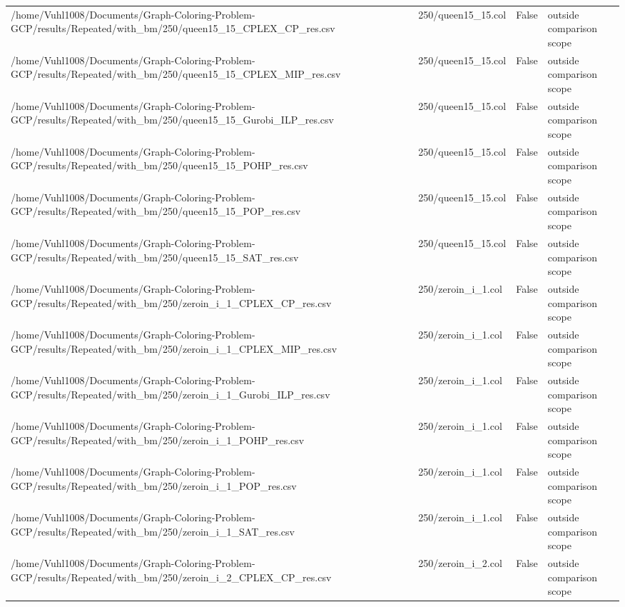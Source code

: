 \begin{table}[htbp]
\begin{tabular}{llll}
/home/Vuhl1008/Documents/Graph-Coloring-Problem-GCP/results/Repeated/with\_bm/250/queen15\_15\_CPLEX\_CP\_res.csv & 250/queen15\_15.col & False & outside comparison scope \\
/home/Vuhl1008/Documents/Graph-Coloring-Problem-GCP/results/Repeated/with\_bm/250/queen15\_15\_CPLEX\_MIP\_res.csv & 250/queen15\_15.col & False & outside comparison scope \\
/home/Vuhl1008/Documents/Graph-Coloring-Problem-GCP/results/Repeated/with\_bm/250/queen15\_15\_Gurobi\_ILP\_res.csv & 250/queen15\_15.col & False & outside comparison scope \\
/home/Vuhl1008/Documents/Graph-Coloring-Problem-GCP/results/Repeated/with\_bm/250/queen15\_15\_POHP\_res.csv & 250/queen15\_15.col & False & outside comparison scope \\
/home/Vuhl1008/Documents/Graph-Coloring-Problem-GCP/results/Repeated/with\_bm/250/queen15\_15\_POP\_res.csv & 250/queen15\_15.col & False & outside comparison scope \\
/home/Vuhl1008/Documents/Graph-Coloring-Problem-GCP/results/Repeated/with\_bm/250/queen15\_15\_SAT\_res.csv & 250/queen15\_15.col & False & outside comparison scope \\
/home/Vuhl1008/Documents/Graph-Coloring-Problem-GCP/results/Repeated/with\_bm/250/zeroin\_i\_1\_CPLEX\_CP\_res.csv & 250/zeroin\_i\_1.col & False & outside comparison scope \\
/home/Vuhl1008/Documents/Graph-Coloring-Problem-GCP/results/Repeated/with\_bm/250/zeroin\_i\_1\_CPLEX\_MIP\_res.csv & 250/zeroin\_i\_1.col & False & outside comparison scope \\
/home/Vuhl1008/Documents/Graph-Coloring-Problem-GCP/results/Repeated/with\_bm/250/zeroin\_i\_1\_Gurobi\_ILP\_res.csv & 250/zeroin\_i\_1.col & False & outside comparison scope \\
/home/Vuhl1008/Documents/Graph-Coloring-Problem-GCP/results/Repeated/with\_bm/250/zeroin\_i\_1\_POHP\_res.csv & 250/zeroin\_i\_1.col & False & outside comparison scope \\
/home/Vuhl1008/Documents/Graph-Coloring-Problem-GCP/results/Repeated/with\_bm/250/zeroin\_i\_1\_POP\_res.csv & 250/zeroin\_i\_1.col & False & outside comparison scope \\
/home/Vuhl1008/Documents/Graph-Coloring-Problem-GCP/results/Repeated/with\_bm/250/zeroin\_i\_1\_SAT\_res.csv & 250/zeroin\_i\_1.col & False & outside comparison scope \\
/home/Vuhl1008/Documents/Graph-Coloring-Problem-GCP/results/Repeated/with\_bm/250/zeroin\_i\_2\_CPLEX\_CP\_res.csv & 250/zeroin\_i\_2.col & False & outside comparison scope \\

\end{tabular}
\end{table}
